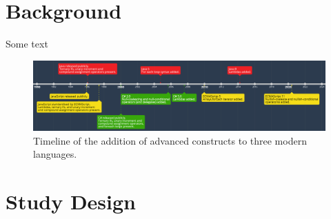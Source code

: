 \documentclass{article}
\begin{document}
\section{Background}
\label{sec:background)}
Some text
\begin{landscape}
    \begin{figure}[htbp]
        \centering
        \vspace{2in}
        \includegraphics[width=1.5\textheight]{timeline}
        \caption{Timeline of the addition of advanced constructs to three modern languages.}
        \label{fig:timeline}
    \end{figure}
\end{landscape}
\section{Study Design}
\end{document}
